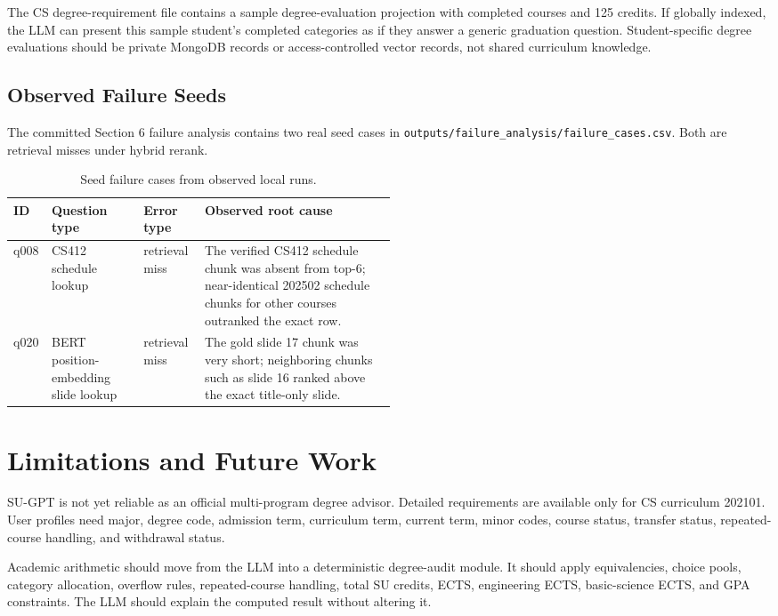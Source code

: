 \documentclass[10pt,a4paper]{article}
\newcommand{\code}[1]{\texttt{\small #1}}
\begin{document}
The CS degree-requirement file contains a sample degree-evaluation projection with completed courses and 125 credits. If globally indexed, the LLM can present this sample student's completed categories as if they answer a generic graduation question. Student-specific degree evaluations should be private MongoDB records or access-controlled vector records, not shared curriculum knowledge.

\subsection{Observed Failure Seeds}

The committed Section 6 failure analysis contains two real seed cases in \code{outputs/failure\_analysis/failure\_cases.csv}. Both are retrieval misses under hybrid rerank.

\begin{table}[H]
\centering
\caption{Seed failure cases from observed local runs.}
\small
\begin{tabularx}{\linewidth}{p{0.10\linewidth}p{0.24\linewidth}p{0.16\linewidth}Y}
\toprule
\textbf{ID} & \textbf{Question type} & \textbf{Error type} & \textbf{Observed root cause}\\
\midrule
q008 & CS412 schedule lookup & retrieval miss & The verified CS412 schedule chunk was absent from top-6; near-identical 202502 schedule chunks for other courses outranked the exact row.\\
q020 & BERT position-embedding slide lookup & retrieval miss & The gold slide 17 chunk was very short; neighboring chunks such as slide 16 ranked above the exact title-only slide.\\
\bottomrule
\end{tabularx}
\end{table}

\section{Limitations and Future Work}

SU-GPT is not yet reliable as an official multi-program degree advisor. Detailed requirements are available only for CS curriculum 202101. User profiles need major, degree code, admission term, curriculum term, current term, minor codes, course status, transfer status, repeated-course handling, and withdrawal status.

Academic arithmetic should move from the LLM into a deterministic degree-audit module. It should apply equivalencies, choice pools, category allocation, overflow rules, repeated-course handling, total SU credits, ECTS, engineering ECTS, basic-science ECTS, and GPA constraints. The LLM should explain the computed result without altering it.
\end{document}
